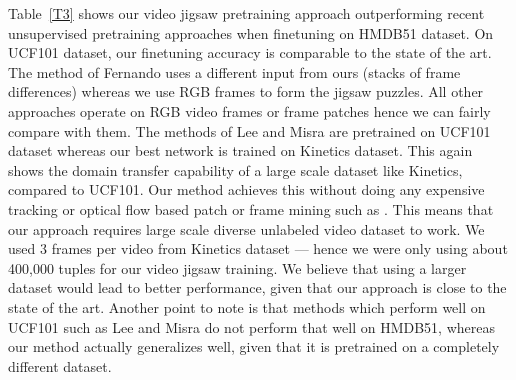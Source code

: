 \documentclass[10pt,twocolumn,letterpaper]{article}
\begin{document}
Table~\ref{T3} shows our video jigsaw pretraining approach outperforming recent unsupervised pretraining approaches when finetuning on HMDB51 dataset. On UCF101 dataset, our finetuning accuracy is comparable to the state of the art. The method of Fernando \etal uses a different input from ours (stacks of frame differences) whereas we use RGB frames to form the jigsaw puzzles. All other approaches operate on RGB video frames or frame patches hence we can fairly compare with them. The methods of Lee \etal \cite{lee2017unsupervised} and Misra \etal \cite{misra2016shuffle} are pretrained on UCF101 dataset whereas our best network is trained on Kinetics dataset. This again shows the domain transfer capability of a large scale dataset like Kinetics, compared to UCF101. Our method achieves this without doing any expensive tracking \cite{wang2015unsupervised} or optical flow based patch or frame mining such as \cite{misra2016shuffle,lee2017unsupervised}. This means that our approach requires large scale diverse unlabeled video dataset to work. We used $3$ frames per video from Kinetics dataset --- hence we were only using about 400,000 tuples for our video jigsaw training. We believe that using a larger dataset would lead to better performance, given that our approach is close to the state of the art. Another point to note is that methods which perform well on UCF101 such as Lee \etal \cite{lee2017unsupervised} and Misra \etal \cite{misra2016shuffle} do not perform that well on HMDB51, whereas our method actually generalizes well, given that it is pretrained on a completely different dataset. 
\end{document}

